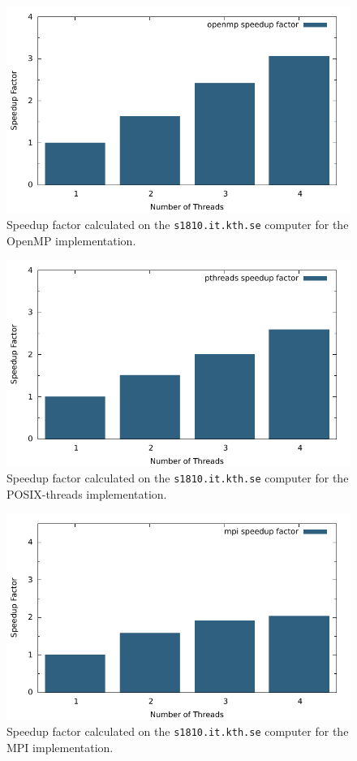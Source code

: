 \begin{figure}[H]
	\includegraphics{plots/openmp_speedup.pdf}
	\caption{Speedup factor calculated on the \texttt{s1810.it.kth.se} computer for the OpenMP implementation.}
\end{figure}
\begin{figure}[H]
	\includegraphics{plots/pthreads_speedup.pdf}
	\caption{Speedup factor calculated on the \texttt{s1810.it.kth.se} computer for the POSIX-threads implementation.}
\end{figure}
\begin{figure}[H]
	\includegraphics{plots/mpi_speedup.pdf}
	\caption{Speedup factor calculated on the \texttt{s1810.it.kth.se} computer
    for the MPI implementation.}
\end{figure}
\newpage
